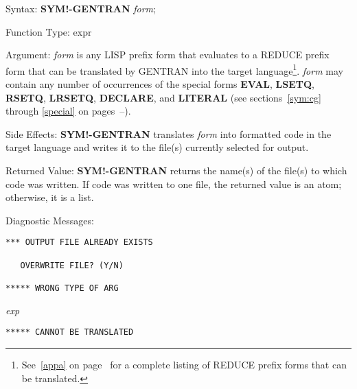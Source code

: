 \begin{describe}{Syntax:}
{\bf SYM!-GENTRAN} {\it form\/};
\end{describe}
\begin{describe}{Function Type:}
expr
\end{describe}
\begin{describe}{Argument:}
{\it form\/} is any LISP prefix form that evaluates to a
REDUCE prefix form that can be translated by GENTRAN into the target
language\footnote{
See~\ref{appa} on page~\pageref{appa} for a complete listing of REDUCE
prefix forms that can be translated.}.
{\it form\/} may contain any number of occurrences of the special forms
   
 
{\bf EVAL}, {\bf LSETQ}, {\bf RSETQ}, {\bf LRSETQ}, {\bf DECLARE}, and
{\bf LITERAL} (see sections~\ref{sym:cg} through \ref{special} on
pages~\pageref{sym:cg}--\pageref{special}).
\end{describe}
\begin{describe}{Side Effects:}
{\bf SYM!-GENTRAN} translates {\it form\/} into formatted code in the target
language and writes it to the file(s) currently selected for output.
\end{describe}
\begin{describe}{Returned Value:}
{\bf SYM!-GENTRAN} returns the name(s) of the file(s) to which code
was written.  If code was written to one file, the returned value is an atom;
otherwise, it is a list.
\end{describe}
\begin{describe}{Diagnostic Messages:}
\begin{verbatim}
*** OUTPUT FILE ALREADY EXISTS

   OVERWRITE FILE? (Y/N)

***** WRONG TYPE OF ARG
\end{verbatim}
{\it exp}
\begin{verbatim}
***** CANNOT BE TRANSLATED
\end{verbatim}
\end{describe}
